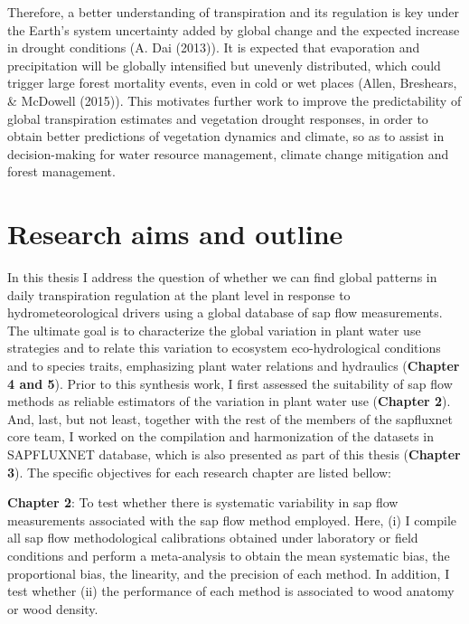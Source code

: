 \documentclass[11pt,twoside]{reedthesis}
\begin{document}
Therefore, a better understanding of transpiration and its regulation is
key under the Earth's system uncertainty added by global change and the
expected increase in drought conditions (A. Dai (2013)). It is expected
that evaporation and precipitation will be globally intensified but
unevenly distributed, which could trigger large forest mortality events,
even in cold or wet places (Allen, Breshears, \& McDowell (2015)). This
motivates further work to improve the predictability of global
transpiration estimates and vegetation drought responses, in order to
obtain better predictions of vegetation dynamics and climate, so as to
assist in decision-making for water resource management, climate change
mitigation and forest management.\par

\section{Research aims and outline}\label{research-aims-and-outline}

In this thesis I address the question of whether we can find global
patterns in daily transpiration regulation at the plant level in
response to hydrometeorological drivers using a global database of sap
flow measurements. The ultimate goal is to characterize the global
variation in plant water use strategies and to relate this variation to
ecosystem eco-hydrological conditions and to species traits, emphasizing
plant water relations and hydraulics (\textbf{Chapter 4 and 5}). Prior
to this synthesis work, I first assessed the suitability of sap flow
methods as reliable estimators of the variation in plant water use
(\textbf{Chapter 2}). And, last, but not least, together with the rest
of the members of the sapfluxnet core team, I worked on the compilation
and harmonization of the datasets in SAPFLUXNET database, which is also
presented as part of this thesis (\textbf{Chapter 3}). The specific
objectives for each research chapter are listed bellow:\par

\textbf{Chapter 2}: To test whether there is systematic variability in
sap flow measurements associated with the sap flow method employed.
Here, (i) I compile all sap flow methodological calibrations obtained
under laboratory or field conditions and perform a meta-analysis to
obtain the mean systematic bias, the proportional bias, the linearity,
and the precision of each method. In addition, I test whether (ii) the
performance of each method is associated to wood anatomy or wood
density.\par
\end{document}
